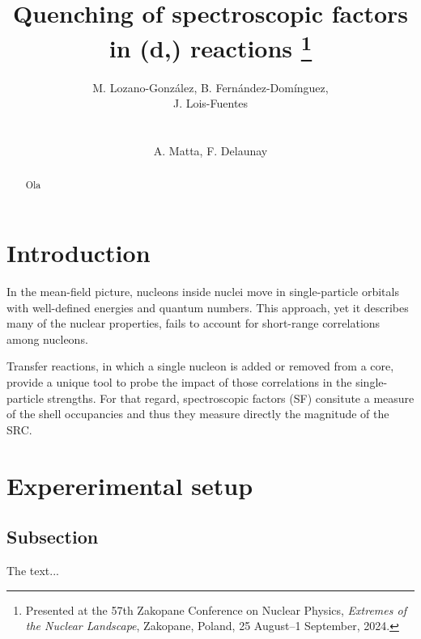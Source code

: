 \documentclass{appolb}
\newcommand{\iso}[2]{\ce{^{#1}#2}}
\begin{document}
\title{Quenching of spectroscopic factors in \iso{10,12}{Be}(d,\iso{3}{He}) reactions %
\thanks{Presented at the 57th Zakopane Conference on Nuclear Physics, {\it Extremes of the Nuclear Landscape}, Zakopane, Poland, 25 August–1 September, 2024.}%
}
\author{M. Lozano-Gonz\'alez, B. Fern\'andez-Dom\'inguez, \\J. Lois-Fuentes
\address{IGFAE and USC}
\\[3mm]
{A. Matta, F. Delaunay %
\address{LPC-Caen}
}
}
\maketitle
\begin{abstract}
    Ola
\end{abstract}
  
\section{Introduction}
In the mean-field picture, nucleons inside nuclei move in single-particle orbitals with well-defined energies and quantum numbers. This approach, yet it describes many of the nuclear properties, fails to account for short-range correlations among nucleons. 

Transfer reactions, in which a single nucleon is added or removed from a core, provide a unique tool to probe the impact of those correlations in the single-particle strengths. For that regard, spectroscopic factors (SF) consitute a measure of the shell occupancies and thus they measure directly the magnitude of the SRC.


\section{Expererimental setup}

\subsection{Subsection}
The text...\cite{lois23}


\printbibliography
\end{document}
